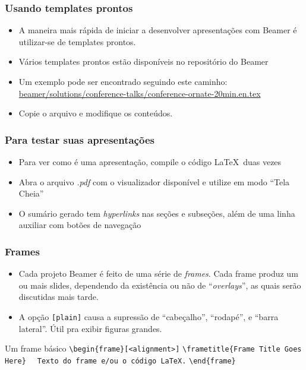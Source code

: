 \begin{frame}
\frametitle{Usando templates prontos}
\begin{itemize}
  \item A maneira mais rápida de iniciar a desenvolver apresentações com Beamer é utilizar-se de
  templates prontos.
  \item Vários templates prontos estão disponíveis no repositório do Beamer
  \item Um exemplo pode ser encontrado seguindo este caminho:
  \url{beamer/solutions/conference-talks/conference-ornate-20min.en.tex}
  \item Copie o arquivo e modifique os conteúdos.
\end{itemize}
\end{frame}

\begin{frame}
\frametitle{Para testar suas apresentações}
\begin{itemize}
  \item Para ver como é uma apresentação, compile o código \LaTeX\ \textcolor{darkcerulean}{duas}
  vezes
  \item Abra o arquivo \textit{.pdf} com o visualizador disponível e utilize em modo ``Tela Cheia''
  \item O sumário gerado tem \textit{hyperlinks} nas seções e subseções, além de uma linha
  auxiliar com botões de navegação
\end{itemize}
\end{frame}

\begin{frame}[fragile]
\frametitle{Frames}
\scriptsize

\begin{itemize}
  \item  Cada projeto Beamer é feito de uma série de \textcolor{darkcerulean}{\textit{frames}}. Cada frame
produz um ou mais slides, dependendo da existência ou não de ``\textit{overlays}'', as quais serão
discutidas mais tarde.
  \item  A opção \verb|[plain]| causa a supressão de ``cabeçalho'', ``rodapé'', e ``barra lateral''.
  Útil pra exibir figuras grandes.

\end{itemize}
\begin{block}{Um frame básico}
	\verb|\begin{frame}[<alignment>]| \newline
  	\verb|\frametitle{Frame Title Goes Here}|\newline
	\verb|	Texto do frame e/ou o código LaTeX.|\newline
	\verb|\end{frame}|
\end{block} 
\end{frame}

